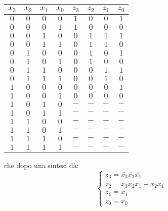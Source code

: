 \documentclass[a4paper,11pt]{article}
\begin{document}
\begin{table}[H]
	\center 
	\begin{tabular} { c  c  c  c | c  c  c  c }
		$x_3$ & $x_2$ & $x_1$ & $x_0$ & $z_3$ & $z_2$ & $z_1$ & $z_0$ \\ 
		\hline
		$0$ & $0$ & $0$ & $0$ & $1$ & $0$ & $0$ & $1$ \\
		$0$ & $0$ & $0$ & $1$ & $1$ & $0$ & $0$ & $0$ \\
		$0$ & $0$ & $1$ & $0$ & $0$ & $1$ & $1$ & $1$ \\
		$0$ & $0$ & $1$ & $1$ & $0$ & $1$ & $1$ & $0$ \\
		$0$ & $1$ & $0$ & $0$ & $0$ & $1$ & $0$ & $1$ \\
		$0$ & $1$ & $0$ & $1$ & $0$ & $1$ & $0$ & $0$ \\
		$0$ & $1$ & $1$ & $0$ & $0$ & $0$ & $1$ & $1$ \\
		$0$ & $1$ & $1$ & $1$ & $0$ & $0$ & $1$ & $0$ \\
		$1$ & $0$ & $0$ & $0$ & $0$ & $0$ & $0$ & $1$ \\
		$1$ & $0$ & $0$ & $1$ & $0$ & $0$ & $0$ & $0$ \\
		$1$ & $0$ & $1$ & $0$ & $-$ & $-$ & $-$ & $-$ \\
		$1$ & $0$ & $1$ & $1$ & $-$ & $-$ & $-$ & $-$ \\
		$1$ & $1$ & $0$ & $0$ & $-$ & $-$ & $-$ & $-$ \\
		$1$ & $1$ & $0$ & $1$ & $-$ & $-$ & $-$ & $-$ \\
		$1$ & $1$ & $1$ & $0$ & $-$ & $-$ & $-$ & $-$ \\
		$1$ & $1$ & $1$ & $1$ & $-$ & $-$ & $-$ & $-$ \\
	\end{tabular}
\end{table}

che dopo una sintesi dà:
\[
	\begin{cases}
		z_3	= \overline{x_3}\overline{x_2}\overline{x_1} \\ 
		z_2 = \overline{x_3}\overline{x_2}x_1 + x_2\overline{x_1} \\ 
		z_1 = x_1 \\ 
		z_0 = \overline{x_0}
	\end{cases}
\]
\end{document}
